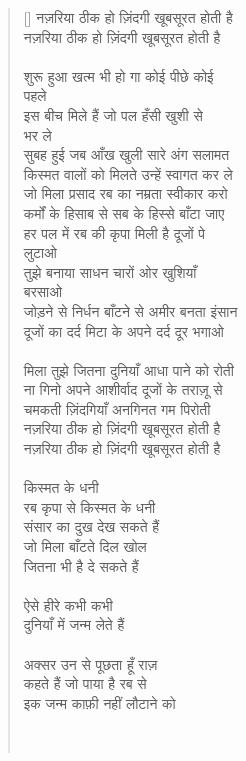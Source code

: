 \begin{verse}[\versewidth]\texthindi{
नज़रिया ठीक हो ज़िंदगी खूबसूरत होती है\\
नज़रिया ठीक हो ज़िंदगी खूबसूरत होती है\\
\\
शुरू हुआ खत्म भी हो गा कोई पीछे कोई\\
पहले\\
इस बीच मिले हैं जो पल हँसी खुशी से\\
भर ले\\
सुबह हुई जब आँख खुली सारे अंग सलामत\\
किस्मत वालों को मिलते उन्हें स्वागत कर ले\\
जो मिला प्रसाद रब का नम्रता स्वीकार करो\\
कर्मों के हिसाब से सब के हिस्से बाँटा जाए\\
हर पल में रब की कृपा मिली है दूजों पे\\
लुटाओ\\
तुझे बनाया साधन चारों ओर खुशियाँ\\
बरसाओ\\
जोड़ने से निर्धन बाँटने से अमीर बनता इंसान\\
दूजों का दर्द मिटा के अपने दर्द दूर भगाओ\\
\\
मिला तुझे जितना दुनियाँ आधा पाने को रोती\\
ना गिनो अपने आशीर्वाद दूजों के तराज़ू से\\
चमकती ज़िंदगियाँ अनगिनत गम पिरोती \\
नज़रिया ठीक हो ज़िंदगी खूबसूरत होती है\\
नज़रिया ठीक हो ज़िंदगी खूबसूरत होती है\\
\\
किस्मत के धनी\\
रब कृपा से किस्मत के धनी\\
संसार का दुख देख सकते हैं\\
जो मिला बाँटते दिल खोल\\
जितना भी है दे सकते हैं\\
\\
ऐसे हीरे कभी कभी\\
दुनियाँ में जन्म लेते हैं\\
\\
अक्सर उन से पूछता हूँ राज़\\
कहते हैं जो पाया है रब से\\
इक जन्म काफ़ी नहीं लौटाने को\\
\\
\\
}
\end{verse}
